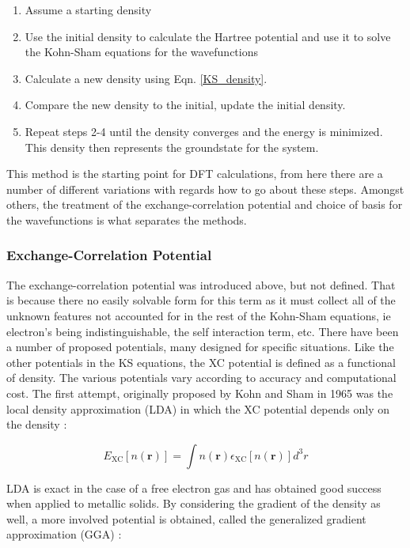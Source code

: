 \begin{enumerate}
	\item Assume a starting density
	\item Use the initial density to calculate the Hartree potential and use it to solve the Kohn-Sham equations for the wavefunctions
	\item Calculate a new density using Eqn. \ref{KS_density}.
	\item Compare the new density to the initial, update the initial density. 
	\item Repeat steps 2-4 until the density converges and the energy is minimized. This density then represents the groundstate for the system.
\end{enumerate}

This method is the starting point for DFT calculations, from here there are a number of different variations with regards how to go about these steps.  Amongst others, the treatment of the exchange-correlation potential and choice of basis for the wavefunctions is what separates the methods.  


\subsubsection{Exchange-Correlation Potential}
The exchange-correlation potential was introduced above, but not defined.  That is because there no easily solvable form for this term as it must collect all of the unknown features not accounted for in the rest of the Kohn-Sham equations, ie electron's being indistinguishable, the self interaction term, etc.   There have been a number of proposed potentials, many designed for specific situations.  Like the other potentials in the KS equations, the XC potential is defined as a functional of density.  The various potentials vary according to accuracy and computational cost.  The first attempt, originally proposed by Kohn and Sham in 1965 was the local density approximation (LDA) in which the XC potential depends only on the density \cite{tao_climbing_2003, ks_1965}: 

\begin{equation}
	E_{\mathrm{XC}}[n(\textbf{r})] = \int  n(\textbf{r}) \epsilon_{\mathrm{XC}}[n(\textbf{r})] d^3r
\end{equation}

LDA is exact in the case of a free electron gas and has obtained good success when applied to metallic solids.  By considering the gradient of the density as well, a more involved potential is obtained, called the generalized gradient approximation (GGA) \cite{tao_climbing_2003,perdew_wang} : 


